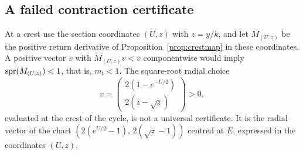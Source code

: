 \subsection{A failed contraction certificate}\label{neg:sec:radial}
At a crest use the section coordinates $(U,z)$ with $z=y/k$, and let $M_{(U,z)}$ be the positive return derivative of Proposition~\ref{prop:crestmap} in these coordinates. A positive vector $v$ with $M_{(U,z)}v<v$ componentwise would imply $\operatorname{spr}(M_{(U,z)})<1$, that is, $m_t<1$. The square-root radial choice
\begin{equation}\label{eq:radial}
v=\begin{pmatrix}2(1-e^{-U/2})\\2(z-\sqrt z)\end{pmatrix}>0 ,
\end{equation}
evaluated at the crest of the cycle, is not a universal certificate. It is the radial vector of the chart $(2(e^{U/2}-1),\,2(\sqrt z-1))$ centred at $E$, expressed in the coordinates $(U,z)$.

